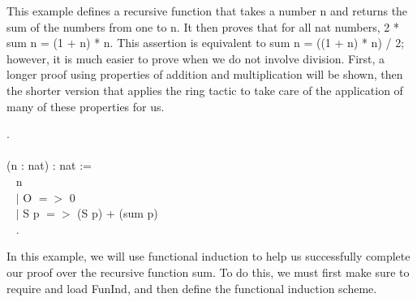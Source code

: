 
This example defines a recursive function that takes a number n and returns the sum of the numbers from one to n.
It then proves that for all nat numbers, 2 * sum n = (1 + n) * n.
This assertion is equivalent to sum n = ((1 + n) * n) / 2; 
however, it is much easier to prove when we do not involve division.
First, a longer proof using properties of addition and multiplication will be shown, 
then the shorter version that applies the ring tactic to take care of the application of many of these properties for us.

\begin{code}
	\Load {}.
	\\ \\
	\Fixpoint {} (n : nat) : nat := 		\\ \-\ \quad
	\match n \with						\\ \-\ \quad
	$\mid$ O $=>$ 0					\\ \-\ \quad
	$\mid$ S p $=>$ (S p) + (sum p)		\\ \-\ \quad
	\End.
\end{code}

\noindent
In this example, we will use functional induction to help us successfully complete our proof over the recursive function sum.
To do this, we must first make sure to require and load FunInd, and then define the functional induction scheme.





